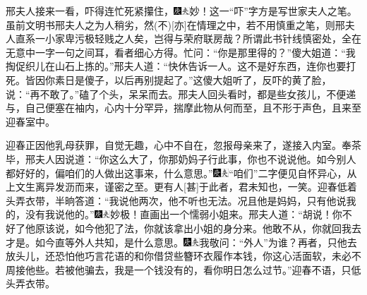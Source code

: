 邢夫人接来一看，吓得连忙死紧攥住，{\includegraphics[width=3mm]{../Images/00004}\includegraphics[width=3mm]{../Images/00012}\footnotesize \kaishu 妙！这一``吓''字方是写世家夫人之笔。虽前文明书邢夫人之为人稍劣，然{(不)}{[}亦{]}在情理之中，若不用慎重之笔，则邢夫人直系一小家卑污极轻贱之人矣，岂得与荣府联房哉？所谓此书针线慎密处，全在无意中一字一句之间耳，看者细心方得。}忙问：``你是那里得的？''傻大姐道：``我掏促织儿在山石上拣的。''邢夫人道：``快休告诉一人。这不是好东西，连你也要打死。皆因你素日是傻子，以后再别提起了。''这傻大姐听了，反吓的黄了脸，说：``再不敢了。''磕了个头，呆呆而去。邢夫人回头看时，都是些女孩儿，不便递与，自己便塞在袖内，心内十分罕异，揣摩此物从何而至，且不形于声色，且来至迎春室中。

迎春正因他乳母获罪，自觉无趣，心中不自在，忽报母亲来了，遂接入内室。奉茶毕，邢夫人因说道：``你这么大了，你那奶妈子行此事，你也不说说他。如今别人都好好的，偏咱们的人做出这事来，什么意思。''{\includegraphics[width=3mm]{../Images/00004}\includegraphics[width=3mm]{../Images/00012}\footnotesize \kaishu ``咱们''二字便见自怀异心，从上文生离异发沥而来，谨密之至。更有人{[}甚{]}于此者，君未知也，一笑。}迎春低着头弄衣带，半晌答道：``我说他两次，他不听也无法。况且他是妈妈，只有他说我的，没有我说他的。''{\includegraphics[width=3mm]{../Images/00004}\includegraphics[width=3mm]{../Images/00012}\footnotesize \kaishu 妙极！直画出一个懦弱小姐来。}邢夫人道：``胡说！你不好了他原该说，如今他犯了法，你就该拿出小姐的身分来。他敢不从，你就回我去才是。如今直等外人共知，是什么意思。{\includegraphics[width=3mm]{../Images/00004}\includegraphics[width=3mm]{../Images/00012}\footnotesize \kaishu 我敬问：``外人''为谁？}再者，只他去放头儿，还恐怕他巧言花语的和你借贷些簪环衣履作本钱，你这心活面软，未必不周接他些。若被他骗去，我是一个钱没有的，看你明日怎么过节。''迎春不语，只低头弄衣带。

